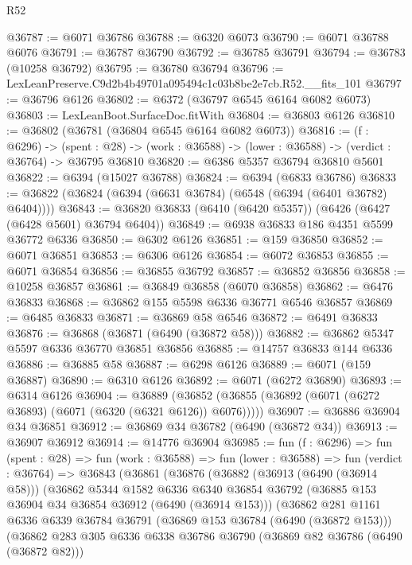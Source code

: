 \begin{lexlean}{R52}
\begin{coremodule}
@36787 := @6071 @36786
@36788 := @6320 @6073
@36790 := @6071 @36788 @6076
@36791 := @36787 @36790
@36792 := @36785 @36791
@36794 := @36783 (@10258 @36792)
@36795 := @36780 @36794
@36796 := LexLeanPreserve.C9d2b4b49701a095494c1c03b8be2e7cb.R52.__fits_101
@36797 := @36796 @6126
@36802 := @6372 (@36797 @6545 @6164 @6082 @6073)
@36803 := LexLeanBoot.SurfaceDoc.fitWith
@36804 := @36803 @6126
@36810 := @36802 (@36781 (@36804 @6545 @6164 @6082 @6073))
@36816 := (f : @6296) ->
  (spent : @28) -> (work : @36588) -> (lower : @36588) -> (verdict : @36764) -> @36795 @36810
@36820 := @6386 @5357 @36794 @36810 @5601
@36822 := @6394 (@15027 @36788)
@36824 := @6394 (@6833 @36786)
@36833 := @36822 (@36824 (@6394 (@6631 @36784) (@6548 (@6394 (@6401 @36782) @6404))))
@36843 := @36820 @36833 (@6410 (@6420 @5357)) (@6426 (@6427 (@6428 @5601) @36794 @6404))
@36849 := @6938 @36833 @186 @4351 @5599 @36772 @6336
@36850 := @6302 @6126
@36851 := @159 @36850
@36852 := @6071 @36851
@36853 := @6306 @6126
@36854 := @6072 @36853
@36855 := @6071 @36854
@36856 := @36855 @36792
@36857 := @36852 @36856
@36858 := @10258 @36857
@36861 := @36849 @36858 (@6070 @36858)
@36862 := @6476 @36833
@36868 := @36862 @155 @5598 @6336 @36771 @6546 @36857
@36869 := @6485 @36833
@36871 := @36869 @58 @6546
@36872 := @6491 @36833
@36876 := @36868 (@36871 (@6490 (@36872 @58)))
@36882 := @36862 @5347 @5597 @6336 @36770 @36851 @36856
@36885 := @14757 @36833 @144 @6336
@36886 := @36885 @58
@36887 := @6298 @6126
@36889 := @6071 (@159 @36887)
@36890 := @6310 @6126
@36892 := @6071 (@6272 @36890)
@36893 := @6314 @6126
@36904 := @36889
    (@36852 (@36855 (@36892 (@6071 (@6272 @36893) (@6071 (@6320 (@6321 @6126)) @6076)))))
@36907 := @36886 @36904 @34 @36851
@36912 := @36869 @34 @36782 (@6490 (@36872 @34))
@36913 := @36907 @36912
@36914 := @14776 @36904
@36985 := fun (f : @6296) =>
  fun (spent : @28) =>
  fun (work : @36588) =>
  fun (lower : @36588) =>
  fun (verdict : @36764) =>
  @36843
    (@36861
      (@36876
        (@36882
          (@36913 (@6490 (@36914 @58)))
          (@36862
            @5344
            @1582
            @6336
            @6340
            @36854
            @36792
            (@36885 @153 @36904 @34 @36854 @36912 (@6490 (@36914 @153)))
            (@36862
              @281
              @1161
              @6336
              @6339
              @36784
              @36791
              (@36869 @153 @36784 (@6490 (@36872 @153)))
              (@36862
                @283
                @305
                @6336
                @6338
                @36786
                @36790
                (@36869 @82 @36786 (@6490 (@36872 @82)))

\end{coremodule}
\end{lexlean}
